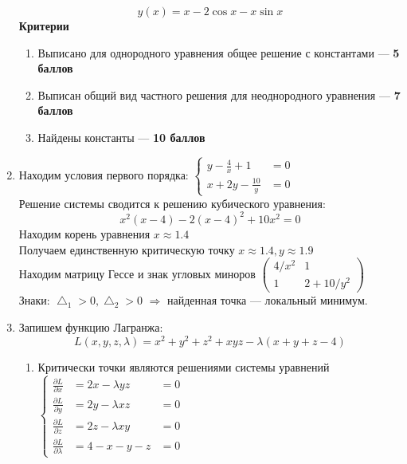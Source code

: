 \documentclass[pdftex,12pt,a4paper]{article}
\begin{document}
\begin{enumerate}
\begin{equation}
y(x)=x-2\cos x-x\sin x
\end{equation}
\textbf{Критерии}
\begin{enumerate}
\item Выписано для однородного уравнения общее решение с константами --- \textbf{5 баллов}
\item Выписан общий вид частного решения для неоднородного уравнения --- \textbf{7 баллов}
\item Найдены константы --- \textbf{10 баллов}
\end{enumerate}
\medskip
\item Находим условия первого порядка:
$\left\{\begin{aligned}
y-\frac{4}{x}+1 & =0\\
x+2y-\frac{10}{y} & =0
\end{aligned}\right.$\\
Решение системы сводится к решению кубического уравнения:
\begin{equation}
x^2(x-4)-2(x-4)^2+10x^2=0
\end{equation}
Находим корень уравнения $x\approx 1.4$\\
Получаем единственную критическую точку $x\approx 1.4, y\approx 1.9$\\
Находим матрицу Гессе и знак угловых миноров
$\left(\begin{array}{cc}
4/x^2 & 1\\
1 & 2+10/y^2
\end{array}\right)$\\
Знаки: $\bigtriangleup_1>0, \bigtriangleup_2>0$ $\Rightarrow$ найденная точка --- локальный минимум.\\
\item Запишем функцию Лагранжа:
\begin{equation}
L(x,y,z,\lambda)=x^2+y^2+z^2+xyz-\lambda(x+y+z-4)
\end{equation}
\begin{enumerate}
\item Критически точки являются решениями системы уравнений\\
$\left\{ \begin{aligned}
\frac{\partial L}{\partial x}& =2x-\lambda yz & =0\\
\frac{\partial L}{\partial y}& =2y-\lambda xz & =0\\
\frac{\partial L}{\partial z}& =2z-\lambda xy & =0\\
\frac{\partial L}{\partial \lambda}& =4-x-y-z & =0
\end{aligned}\right.$\\

\end{enumerate}
\end{enumerate}
\end{document}
